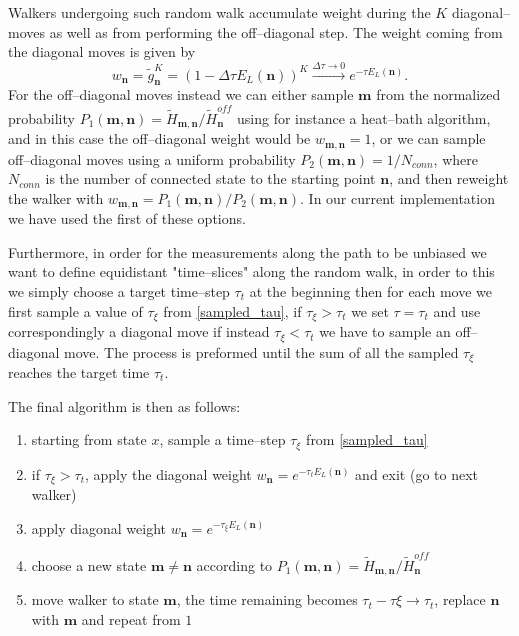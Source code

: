 Walkers undergoing such random walk accumulate weight during the $K$ diagonal--moves as well as from performing the off--diagonal step. The weight coming from the diagonal
moves is given by
\begin{equation}
w_{\mathbf{n}}=\tilde{g}_{\mathbf{n}}^K = \left( 1-\Delta\tau E_L(\mathbf{n})\right)^K \xrightarrow{\Delta\tau \to 0} e^{-\tau E_L(\mathbf{n})}.
\end{equation}
For the off--diagonal moves instead we can either sample $\mathbf{m}$ from the normalized probability $P_1(\mathbf{m},\mathbf{n})=\tilde{H}_{\mathbf{m},\mathbf{n}}/ \tilde{H}^{off}_{\mathbf{n}}$ using for instance a heat--bath
algorithm, and in this case the off--diagonal weight would be $w_{\mathbf{m},\mathbf{n}}=1$, or we can sample off--diagonal moves using a uniform probability $P_2(\mathbf{m},\mathbf{n})=1/N_{conn}$, where
$N_{conn}$ is the number of connected state to the starting point $\mathbf{n}$, and then reweight the walker with $w_{\mathbf{m},\mathbf{n}} = P_1(\mathbf{m},\mathbf{n})/P_2(\mathbf{m},\mathbf{n})$. In our current implementation we have
used the first of these options.

Furthermore, in order for the measurements along the path to be unbiased we want to define equidistant "time--slices" along the random walk, in order to this we simply choose a target time--step $\tau_t$ at the beginning then for each move we first sample a value of $\tau_{\xi}$ from \eqref{sampled_tau}, if $\tau_{\xi} > \tau_t$ we set $\tau=\tau_t$ and use correspondingly a diagonal move if instead $\tau_{\xi} < \tau_t$ we have to sample an off--diagonal move. The process is preformed until the sum of all the sampled $\tau_{\xi}$
reaches the target time $\tau_t$. 

The final algorithm is then as follows: 
\begin{algorithmic} 
\EndIf
\EndFor
\end{algorithmic}



\begin{enumerate}
\item starting from state $x$, sample a time--step $\tau_{\xi}$ from \eqref{sampled_tau}
\item if $\tau_{\xi} > \tau_t$, apply the diagonal weight $w_{\mathbf{n}} = e^{-\tau_t E_L(\mathbf{n})}$ and exit (go to next walker)
\item apply diagonal weight $w_{\mathbf{n}} = e^{-\tau_{\xi} E_L(\mathbf{n})}$
\item choose a new state $\mathbf{m}\neq \mathbf{n}$ according to $P_1(\mathbf{m},\mathbf{n})=\tilde{H}_{\mathbf{m},\mathbf{n}}/\tilde{H}^{off}_{\mathbf{n}}$
\item move walker to state $\mathbf{m}$, the time remaining becomes $\tau_t - \tau{\xi} \to \tau_t$, replace $\mathbf{n}$ with $\mathbf{m}$ and repeat from $1$ 
\end{enumerate}

